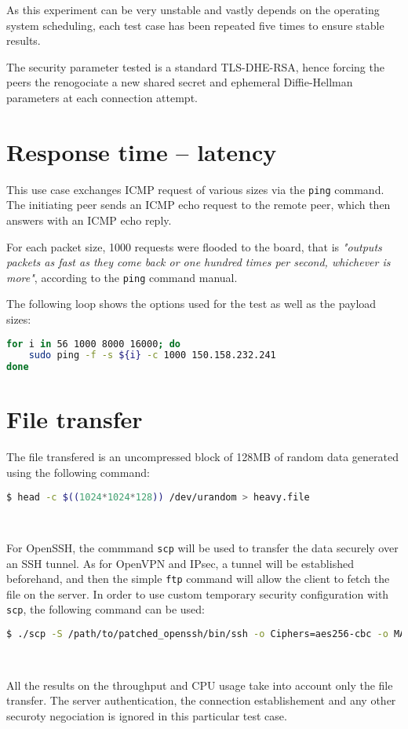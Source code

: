 As this experiment can be very unstable and vastly depends on the operating system scheduling, each test case has been repeated five times to ensure stable results.

The security parameter tested is a standard TLS-DHE-RSA, hence forcing the peers the renogociate a new shared secret and ephemeral Diffie-Hellman parameters at each connection attempt.


\section{Response time -- latency}
This use case exchanges ICMP request of various sizes via the \texttt{ping} command.
The initiating peer sends an ICMP echo request to the remote peer, which then answers with an ICMP echo reply.

\noindent For each packet size, 1000 requests were flooded to the board, that is \textit{"outputs packets as fast as they come back or one hundred times per second, whichever is more"}, according to the \texttt{ping} command manual.

The following loop shows the options used for the test as well as the payload sizes:
\begin{lstlisting}[language=bash]
for i in 56 1000 8000 16000; do
	sudo ping -f -s ${i} -c 1000 150.158.232.241
done
\end{lstlisting}

\section{File transfer}
The file transfered is an uncompressed block of 128MB of random data generated using the following command:
\begin{lstlisting}[language=bash]
  $ head -c $((1024*1024*128)) /dev/urandom > heavy.file
\end{lstlisting}~\newline{}

For OpenSSH, the commmand \texttt{scp} will be used to transfer the data securely over an SSH tunnel.
As for OpenVPN and IPsec, a tunnel will be established beforehand, and then the simple \texttt{ftp} command will allow the client to fetch the file on the server.
In order to use custom temporary security configuration with \texttt{scp}, the following command can be used:
\begin{lstlisting}[language=bash]
  $ ./scp -S /path/to/patched_openssh/bin/ssh -o Ciphers=aes256-cbc -o MACs=none@barco.com root@150.158.232.241:heavy.file .
\end{lstlisting}~\newline{}


All the results on the throughput and CPU usage take into account only the file transfer.
The server authentication, the connection establishement and any other securoty negociation is ignored in this particular test case.